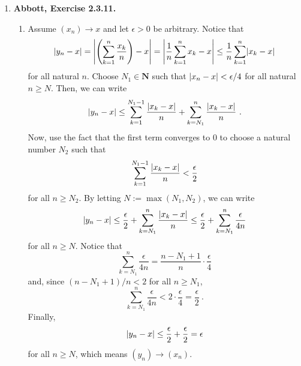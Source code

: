\documentclass{article}
\DeclarePairedDelimiter\abs{\lvert}{\rvert}
\newcommand{\N}{\mathbf{N}}
\newcommand{\exc}[2][Abbott]{\item \textbf{#1, Exercise #2.}}
\let\oldmax\max
\renewcommand{\max}[1]{\oldmax \left( #1 \right)}
\begin{document}
\begin{enumerate}
	\exc{2.3.11}
	\begin{enumerate}
		\item Assume $(x_n) \rightarrow x$ and let $\epsilon > 0$ be arbitrary. Notice that \begin{equation*}
		      \abs*{y_n-x} = \abs*{\left (\sum\limits_{k=1}^{n} \frac{x_k}{n}\right)-x} = \abs*{\frac{1}{n} \sum\limits_{k=1}^{n} x_k-x} \leq \frac{1}{n} \sum\limits_{k=1}^n \abs*{x_k-x}
		\end{equation*} for all natural $n$. Choose $N_1 \in \N$ such that $\abs*{x_n-x} < \epsilon/4$ for all natural $n \geq N$. Then, we can write \begin{equation*}
		\abs*{y_n-x} \leq \sum\limits_{k=1}^{N_1-1} \frac{\abs*{x_k-x}}{n} + \sum\limits_{k=N_1}^{n} \frac{\abs*{x_k-x}}{n} ~ .
		\end{equation*} Now, use the fact that the first term converges to $0$ to choose a natural number $N_2$ such that \begin{equation*}
		\sum\limits_{k=1}^{N_1-1} \frac{\abs*{x_k-x}}{n} < \frac{\epsilon}{2}
		\end{equation*} for all $n \geq N_2$. By letting $N := \max{N_1, N_2}$, we can write \begin{equation*}
		\abs*{y_n-x} \leq \frac{\epsilon}{2} + \sum\limits_{k=N_1}^{n} \frac{\abs*{x_k-x}}{n} \leq \frac{\epsilon}{2} + \sum\limits_{k=N_1}^{n} \frac{\epsilon}{4n}
		\end{equation*} for all $n \geq N$. Notice that \begin{equation*}
		\sum\limits_{k=N_1}^{n} \frac{\epsilon}{4n} = \frac{n-N_1+1}{n} \cdot \frac{\epsilon}{4}
		\end{equation*} and, since $(n-N_1 + 1) / n < 2$ for all $n \geq N_1$, \begin{equation*}
		\sum\limits_{k=N_1}^{n} \frac{\epsilon}{4n} < 2 \cdot \frac{\epsilon}{4} = \frac{\epsilon}{2} ~.
		\end{equation*} Finally, \begin{equation*}
		\abs*{y_n-x} \leq \frac{\epsilon}{2} + \frac{\epsilon}{2} = \epsilon
		\end{equation*} for all $n \geq N$, which means $(y_n) \rightarrow (x_n)$.
							     

\end{enumerate}
\end{enumerate}
\end{document}
